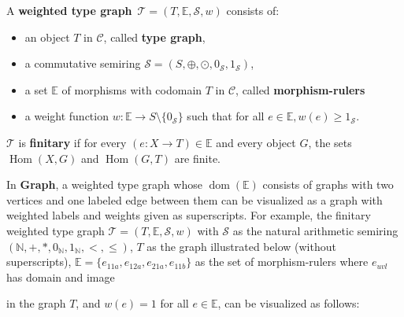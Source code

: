 \begin{definition}
    \label{def:weighted_type_graph}
    A \textbf{weighted type graph}~\(\mathcal{T} = (T, \mathbb{E}, \mathcal{S}, w)\) consists of:
    \begin{itemize} 
        \item an object \(T\) in $\mathcal{C}$, called \textbf{type graph},
        \item a commutative semiring \(\mathcal{S}=(S, \oplus, \odot, 0_\mathcal{S}, 1_\mathcal{S})\),
        \item a set \(\mathbb{E}\) of morphisms with codomain $T$ in $\mathcal{C}$, called \textbf{morphism-rulers}
        \item a weight function \(w : \mathbb{E} \to S \setminus \{0_\mathcal{S}\}\) such that for all $e \in \mathbb{E}, w(e) \geq 1_\mathcal{S}$.
    \end{itemize}
    \(\mathcal{T}\) is \textbf{finitary} if for every \( (e :X \to T) \in \mathbb{E}\) and every object \(G\), the sets \(\operatorname{Hom}(X, G)\) and \(\operatorname{Hom}(G, T)\) are finite.
\end{definition}

\begin{example}
    \label{example:wft:weighted_type_graph}
     In \textbf{Graph}, a weighted type graph 
     whose $\operatorname{dom}(\mathbb{E})$ consists of graphs with two vertices and one labeled edge between them
     can be visualized as a graph with weighted labels and weights given as superscripts. For example, the finitary weighted type graph $\mathcal{T} = (T, \mathbb{E}, \mathcal{S}, w)$ with $\mathcal{S}$ as the natural arithmetic semiring $(\mathbb{N}, +, *, 0_\mathbb{N}, 1_\mathbb{N}, <,\leq)$,
     $T$ as the graph illustrated below (without superscripts), $\mathbb{E}=\{e_{11a},e_{12a},e_{21a},e_{11b}\}$ as the set of morphism-rulers where 
     $e_{uvl}$ has domain 
      and image 
     in the graph $T$,
    and $w(e) = 1$ for all $e \in \mathbb{E}$, can be visualized as follows:
    \begin{center}
    \end{center}
\end{example}